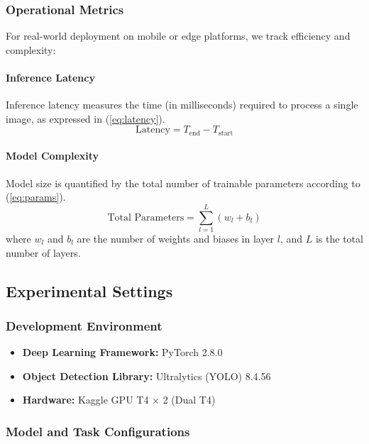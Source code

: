 \documentclass[10pt, conference]{IEEEtran}
\begin{document}
\subsubsection{Operational Metrics}

For real-world deployment on mobile or edge platforms, we track efficiency and complexity:

\paragraph{Inference Latency}
Inference latency measures the time (in milliseconds) required to process a single image, as expressed in (\ref{eq:latency}).
\begin{equation}
    \label{eq:latency}
    \text{Latency} = T_{\mathrm{end}} - T_{\mathrm{start}}
\end{equation}

\paragraph{Model Complexity}
Model size is quantified by the total number of trainable parameters according to (\ref{eq:params}).
\begin{equation}
    \label{eq:params}
    \text{Total Parameters} = \sum_{l=1}^{L} \left( w_l + b_l \right)
\end{equation}
where $w_l$ and $b_l$ are the number of weights and biases in layer $l$, and $L$ is the total number of layers.

\subsection{Experimental Settings}
\label{subsec:settings}

\subsubsection{Development Environment}

\begin{itemize}
    \item \textbf{Deep Learning Framework:} PyTorch 2.8.0
    \item \textbf{Object Detection Library:} Ultralytics (YOLO) 8.4.56
    \item \textbf{Hardware:} Kaggle GPU T4 $\times$ 2 (Dual T4)
\end{itemize}

\subsubsection{Model and Task Configurations}
\end{document}
